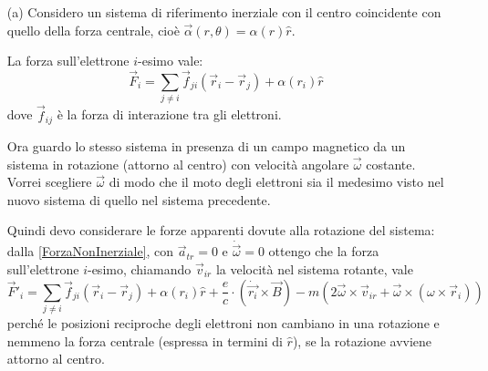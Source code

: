 \documentclass[../main.tex]{subfiles}
\begin{document}
  \solution
  \begin{itemize}
    \item[(a)]
    Considero un sistema di riferimento inerziale con il centro coincidente con quello della forza centrale, cio\`e $\vec \alpha(r, \theta)=\alpha(r)\hat r$.
    
    La forza sull'elettrone $i$-esimo vale:
    \begin{equation}
      \label{ecm:forzai}
      \vec F_i= \sum_{j \neq i} \vec f_{ji}(\vec r_i-\vec r_j)+\alpha(r_i)\hat r
    \end{equation}
    dove $\vec f_{ij}$ \`e la forza di interazione tra gli elettroni.
    
    Ora guardo lo stesso sistema in presenza di un campo magnetico da un sistema in rotazione (attorno al centro) con velocit\`a angolare $\vec\omega$ costante.
    Vorrei scegliere $\vec \omega$ di modo che il moto degli elettroni sia il medesimo visto nel nuovo sistema di quello nel sistema precedente.
    
    Quindi devo considerare le forze apparenti dovute alla rotazione del sistema: dalla \cref{ForzaNonInerziale}, con $\vec a_{tr}=0$ e $\dot{\vec \omega}=0$ ottengo che la forza sull'elettrone $i$-esimo, chiamando $\vec v_{ir}$ la velocità nel sistema rotante, vale 
    \begin{equation}
      \label{ecm:forzar}
      \vec F'_i= \sum_{j \neq i} \vec f_{ji}(\vec r_i-\vec r_j)+\alpha(r_i)\hat r+\frac{e}{c} \cdot \left(\dot {\vec {r_i}} \times \vec B\right)-m (2 \vec \omega \times \vec v_{ir}+ \vec \omega \times (\omega \times \vec r_i))
    \end{equation}
    perch\'e le posizioni reciproche degli elettroni non cambiano in una rotazione e nemmeno la forza centrale (espressa in termini di $\hat r$), se la rotazione avviene attorno al centro.
    

\end{itemize}
\end{document}
